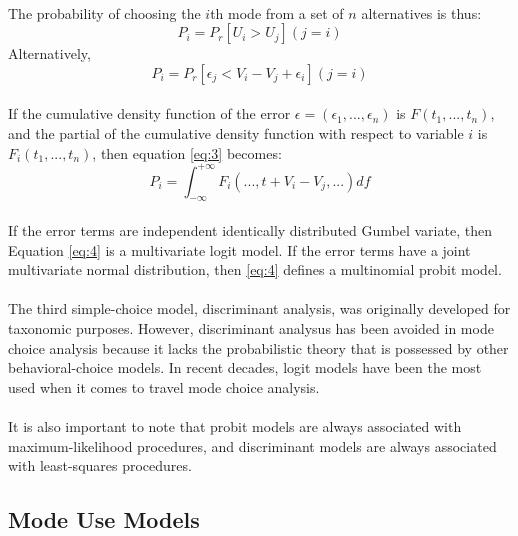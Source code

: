 \paragraph{} The probability of choosing the $i$th mode from a set of $n$ alternatives is thus:
\begin{equation}
P_i = P_r[U_i>U_j](j=i)
\end{equation}
Alternatively, 
\begin{equation}\label{eq:3}
P_i = P_r[\epsilon_j < V_i - V_j + \epsilon_i](j=i)
\end{equation}
\paragraph{}If the cumulative density function of the error $\epsilon =(\epsilon_1, . . . , \epsilon_n)$ is $F(t_1, . . . , t_n)$, and the partial of the cumulative density function with respect to variable $i$ is $F_i(t_1, . . . , t_n)$, then equation \ref{eq:3} becomes:
\begin{equation}\label{eq:4}
P_i = 	\int_{-\infty}^{+\infty} F_i(. . . , t + V_i - V_j, . . .)df
\end{equation}
\paragraph{}If the error terms are independent identically distributed Gumbel variate, then Equation \ref{eq:4} is a multivariate logit model. If the error terms have a joint multivariate normal distribution, then \ref{eq:4} defines a multinomial probit model. 
\paragraph{}The third simple-choice model, discriminant analysis, was originally developed for taxonomic purposes. However, discriminant analysus has been avoided in mode choice analysis because it lacks the probabilistic theory that is possessed by other behavioral-choice models. In recent decades, logit models have been the most used when it comes to travel mode choice analysis.
\paragraph{}It is also important to note that probit models are always associated with maximum-likelihood procedures, and discriminant models are always associated with least-squares procedures.

\subsection{Mode Use Models}
